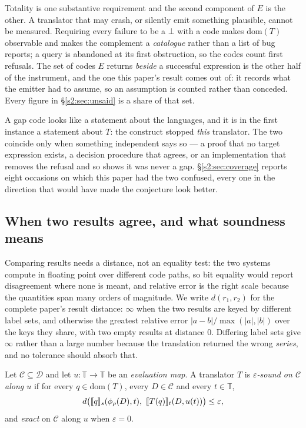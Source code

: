 \noindent
Totality is one substantive requirement and the second component of $E$ is the other. A
translator that may crash, or silently emit something plausible, cannot be measured.
Requiring every failure to be a $\bot$ with a code makes $\mathrm{dom}(T)$ observable and
makes the complement a \emph{catalogue} rather than a list of bug reports; a query is
abandoned at its first obstruction, so the codes count first refusals. The set of codes $E$
returns \emph{beside} a successful expression is the other half of the instrument, and the
one this paper's result comes out of: it records what the emitter had to assume, so an
assumption is counted rather than conceded. Every figure in \S\ref{s2:sec:unsaid} is a
share of that set.

\begin{remark}\label{s2:rem:refusal}
A gap code looks like a statement about the languages, and it is in the first instance a
statement about $T$: the construct stopped \emph{this} translator. The two coincide only
when something independent says so --- a proof that no target expression exists, a decision
procedure that agrees, or an implementation that removes the refusal and so shows it was
never a gap. \S\ref{s2:sec:coverage} reports eight occasions on which this paper had the two
confused, every one in the direction that would have made the conjecture look better.
\end{remark}

\subsection{When two results agree, and what soundness means}

Comparing results needs a distance, not an equality test: the two systems compute in
floating point over different code paths, so bit equality would report disagreement where
none is meant, and relative error is the right scale because the quantities span many
orders of magnitude. We write $d(r_1,r_2)$ for the complete paper's result distance:
$\infty$ when the two results are keyed by different label sets, and otherwise the greatest
relative error $|a-b|/\max(|a|,|b|)$ over the keys they share, with two empty results at
distance $0$. Differing label sets give $\infty$ rather than a large number because the
translation returned the wrong \emph{series}, and no tolerance should absorb that.

\begin{definition}\label{s2:def:sound}
Let $\mathcal{C}\subseteq\mathcal{D}$ and let $u:\mathbb{T}\to\mathbb{T}$ be an
\emph{evaluation map}. A translator $T$ is \emph{$\varepsilon$-sound on $\mathcal{C}$
along $u$} if for every $q\in\mathrm{dom}(T)$, every $D\in\mathcal{C}$ and every
$t\in\mathbb{T}$,
\[
d\big(\sem{q}_s(\phi_\rho(D),t),\ \sem{T(q)}_t(D,u(t))\big)\le\varepsilon,
\]
and \emph{exact} on $\mathcal{C}$ along $u$ when $\varepsilon=0$.
\end{definition}

